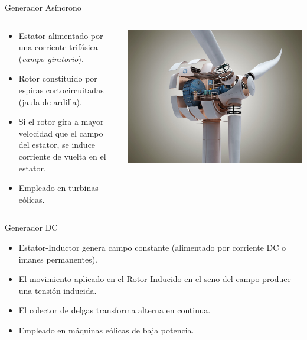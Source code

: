 \documentclass[xcolor={usenames,svgnames,dvipsnames}]{beamer}
\begin{document}
\begin{frame}[label={sec:org0697f77}]{Generador Asíncrono}
\begin{columns}
\begin{column}{0.6\columnwidth}
\begin{itemize}
\item \alert{Estator} alimentado por una corriente trifásica (\emph{campo giratorio}).

\item \alert{Rotor} constituido por espiras cortocircuitadas (\alert{jaula de ardilla}).

\item Si el rotor gira a mayor velocidad que el campo del estator, se induce corriente \guillemotleft{}de vuelta\guillemotright{} en el estator.

\item Empleado en turbinas eólicas.
\end{itemize}
\end{column}

\begin{column}{0.5\columnwidth}
\begin{center}
\includegraphics[width=.9\linewidth]{../figs/InsideWindTurbine.jpg}
\end{center}
\end{column}
\end{columns}
\end{frame}

\begin{frame}[label={sec:orgb9e1f8d}]{Generador DC}
\begin{itemize}
\item \alert{Estator-Inductor} genera campo constante (alimentado por corriente DC o imanes permanentes).

\item El movimiento aplicado en el \alert{Rotor-Inducido} en el seno del campo produce una \alert{tensión inducida}.

\item El colector de delgas transforma alterna en continua.

\item Empleado en máquinas eólicas de baja potencia.
\end{itemize}
\end{frame}
\end{document}
